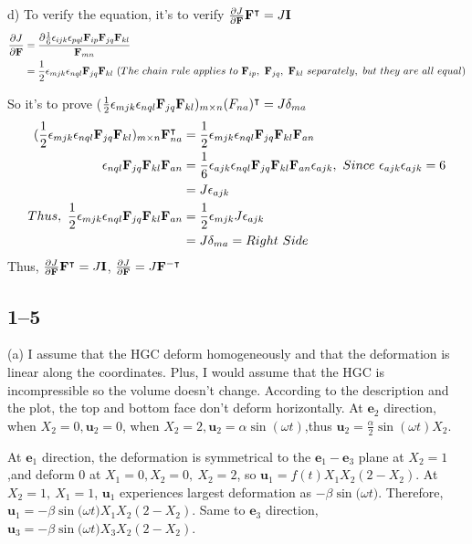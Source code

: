 d) 
To verify the equation, it's to verify $\frac{\partial J}{\partial \mathbf{F}}\mathbf{F}^{\intercal} = J\mathbf{I}$
\begin{align*}
    \frac{\partial J}{\partial \bn{F}} &= \frac{\partial \frac{1}{6}\epsilon_{ijk} \epsilon_{pql}\bn{F}_{ip}\bn{F}_{jq}\bn{F}_{kl}}{\bn{F}_{mn}} \\
    &= \frac12 \epsilon_{mjk} \epsilon_{nql}\bn{F}_{jq}\bn{F}_{kl}\ (The\ chain\ rule\ applies\ to\ \bn{F}_{ip},\ \bn{F}_{jq},\ \bn{F}_{kl}\ separately,\ but\ they\ are\ all\ equal)
\end{align*}

So it's to prove ($\frac12 \epsilon_{mjk} \epsilon_{nql}\mathbf{F}_{jq}\mathbf{F}_{kl})_{m\times n}(F_{na})^{\intercal}=J\delta_{ma}$
\begin{align*}
    (\frac12\epsilon_{mjk} \epsilon_{nql}\bn{F}_{jq}\bn{F}_{kl})_{m\times n}\bn{F}_{na}^{\intercal} &= \frac12\epsilon_{mjk} \epsilon_{nql}\bn{F}_{jq}\bn{F}_{kl}\bn{F}_{an} \\
    \epsilon_{nql}\bn{F}_{jq}\bn{F}_{kl}\bn{F}_{an} &= \frac16\epsilon_{ajk}\epsilon_{nql}\bn{F}_{jq}\bn{F}_{kl}\bn{F}_{an}\epsilon_{ajk}, \ Since\ \epsilon_{ajk}\epsilon_{ajk}=6\\
    &= J\epsilon_{ajk} \\
    Thus,\ \frac12\epsilon_{mjk} \epsilon_{nql}\bn{F}_{jq}\bn{F}_{kl}\bn{F}_{an} &=\frac12\epsilon_{mjk}J\epsilon_{ajk}\\&=J\delta_{ma} = Right\ Side
\end{align*}
Thus, $\frac{\partial J}{\partial \mathbf{F}}\mathbf{F}^{\intercal} = J\mathbf{I}$, $\frac{\partial J}{\partial \mathbf{F}} = J \mathbf{F}^{-\intercal}$


\subsection*{1--5}
(a)
I assume that the HGC deform homogeneously and that the deformation is linear along the coordinates. Plus, I would assume that the HGC is incompressible so the volume doesn't change.
\medskip
According to the description and the plot, the top and bottom face don't deform horizontally. At $\bm{e}_2$ direction, when $X_2 = 0, \bm{u}_2=0$, when $X_2 = 2, \bm{u}_2=\alpha\sin({\omega t})$,thus $\bm{u}_2 = \frac{\alpha}{2}\sin({\omega t}) X_2$.

\medskip
At $\bm{e}_1$ direction, the deformation is symmetrical to the $\bm{e}_1 - \bm{e}_3$ plane at $X_2 = 1$,and deform 0 at $X_1=0,X_2=0,\ X_2=2$, so  $\bm{u}_1 = f(t)X_1X_2(2-X_2)$. At $X_2=1,\ X_1=1$, $\bm{u}_1$ experiences largest deformation as $-\beta \sin{(\omega t})$. Therefore, $\bm{u}_1 = -\beta \sin{(\omega t})X_1X_2(2-X_2)$. Same to $\bm{e}_3$ direction, $\bm{u}_3 = -\beta \sin{(\omega t})X_3X_2(2-X_2)$.

